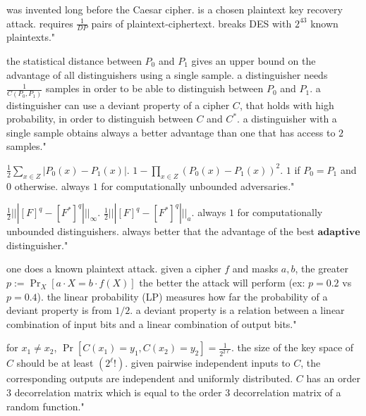 {was invented long before the Caesar cipher.}
{is a chosen plaintext key recovery attack.}
{requires $\frac{1}{DP}$ pairs of plaintext-ciphertext.}
{breaks DES with $2^{43}$ known plaintexts."}

{the statistical distance between $P_0$ and $P_1$ gives an upper bound on the advantage of all distinguishers using a single sample.}
{a distinguisher needs $\frac{1}{C(P_0,P_1)}$ samples in order to be able to distinguish between $P_0$ and $P_1$.}
{a distinguisher can use a deviant property of a cipher $C$, that holds with high probability, in order to distinguish between $C$ and $C^{*}$.}
{a distinguisher with a single sample obtains always a better advantage than one that has access to $2$ samples."}

{$\frac{1}{2}\sum_{x\in Z} | P_0(x) - P_1(x)|$.}
{$1 - \prod_{x\in Z}(P_0(x)-P_1(x))^2$.}
{$1$ if $P_0 = P_1$ and $0$ otherwise.}
{always $1$ for computationally unbounded adversaries."}

{$\frac{1}{2}|||[F]^q - [F^*]^q |||_{\infty}$.}
{$\frac{1}{2}|||[F]^q - [F^*]^q |||_{a}$.}
{always $1$ for computationally unbounded distinguishers.}
{always better that the advantage of the best $ \textbf{adaptive} $ distinguisher."}

{one does a known plaintext attack.}
{given a cipher $f$ and masks $a,b$, the greater $p:=\Pr_X[a\cdot X = b \cdot f(X)]$ the better the attack will perform (ex: $p = 0.2$ vs $p= 0.4$).}
{the linear probability (LP) measures how far the probability of a deviant property is from $1/2$.}
{a deviant property is a relation between a linear combination of input bits and a linear combination of output bits."}

{for $x_1 \neq x_2$, $\Pr[C(x_1) = y_1, C(x_2)=y_2] = \frac{1}{2^{2\ell}}$.}
{the size of the key space of $C$ should be at least $(2^{\ell}!)$.}
{given pairwise independent inputs to $C$, the corresponding outputs are independent and uniformly distributed.}
{$C$ has an order $3$ decorrelation matrix which is equal to the order $3$ decorrelation matrix of a random function."}

